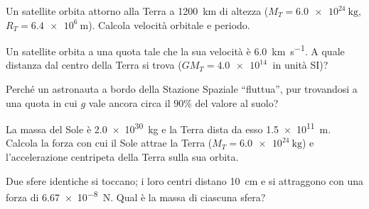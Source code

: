 \begin{esercizio}
Un satellite orbita attorno alla Terra a \SI{1200}{\kilo\metre} di altezza ($M_T = \SI{6,0e24}{\kilo\gram}$, $R_T = \SI{6,4e6}{\metre}$). Calcola velocità orbitale e periodo.\\
\end{esercizio}

\begin{esercizio}
Un satellite orbita a una quota tale che la sua velocità è \SI{6,0}{\kilo\metre\per\second}. A quale distanza dal centro della Terra si trova ($G M_T = \SI{4,0e14}{}$ in unità SI)?\\
\end{esercizio}

\begin{esercizio}
Perché un astronauta a bordo della Stazione Spaziale ``fluttua'', pur trovandosi a una quota in cui $g$ vale ancora circa il $90\%$ del valore al suolo?\\
\end{esercizio}

\begin{esercizio}
La massa del Sole è \SI{2,0e30}{\kilo\gram} e la Terra dista da esso \SI{1,5e11}{\metre}. Calcola la forza con cui il Sole attrae la Terra ($M_T = \SI{6,0e24}{\kilo\gram}$) e l'accelerazione centripeta della Terra sulla sua orbita.\\
\end{esercizio}

\begin{esercizio}
Due sfere identiche si toccano; i loro centri distano \SI{10}{\centi\metre} e si attraggono con una forza di \SI{6,67e-8}{\newton}. Qual è la massa di ciascuna sfera?\\
\end{esercizio}

